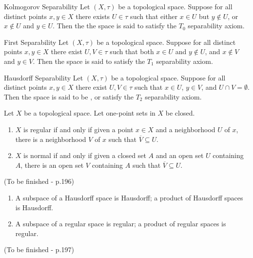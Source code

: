 \documentclass[12pt, a4paper, twoside, openright, titlepage]{book}
\begin{document}
\begin{defn}{Kolmogorov Separability}{}
    Let $(X,\tau)$ be a topological space. Suppose for all distinct points $x,y \in X$ there exists $U \in \tau$ such that either $x \in U$ but $y \notin U$, or $x \notin U$ and $y \in U$. Then the the space is said to satisfy the $T_0$ separability axiom.
\end{defn}


\begin{defn}{First Separability}{}
    Let $(X,\tau)$ be a topological space. Suppose for all distinct points $x,y \in X$ there exist $U,V \in \tau$ such that both $x \in U$ and $y \notin U$, and $x \notin V$ and $y \in V$. Then the space is said to satisfy the $T_1$ separability axiom.
\end{defn}


\begin{defn}{Hausdorff Separability}{}
    Let $(X,\tau)$ be a topological space. Suppose for all distinct points $x,y \in X$ there exist $U,V \in \tau$ such that $x \in U$, $y \in V$, and $U\cap V = \emptyset$. Then the space is said to be , or satisfy the $T_2$ separability axiom.
\end{defn}

\begin{lem}{}{}
    Let $X$ be a topological space. Let one-point sets in $X$ be closed. \begin{enumerate}
        \item $X$ is regular if and only if given a point $x \in X$ and a neighborhood $U$ of $x$, there is a neighborhood $V$ of $x$ such that $\overline{V} \subseteq U$.
        \item $X$ is normal if and only if given a closed set $A$ and an open set $U$ containing $A$, there is an open set $V$ containing $A$ such that $\overline{V}\subseteq U$.
    \end{enumerate}
\end{lem}
\begin{proof*}{}{}
    (To be finished - p.196)
\end{proof*}

\begin{thm}{}{}
    \leavevmode
    \begin{enumerate}
        \item A subspace of a Hausdorff space is Hausdorff; a product of Hausdorff spaces is Hausdorff.
        \item A subspace of a regular space is regular; a product of regular spaces is regular.
    \end{enumerate}
\end{thm}
\begin{proof*}{}{}
    (To be finished - p.197)
\end{proof*}
\end{document}
